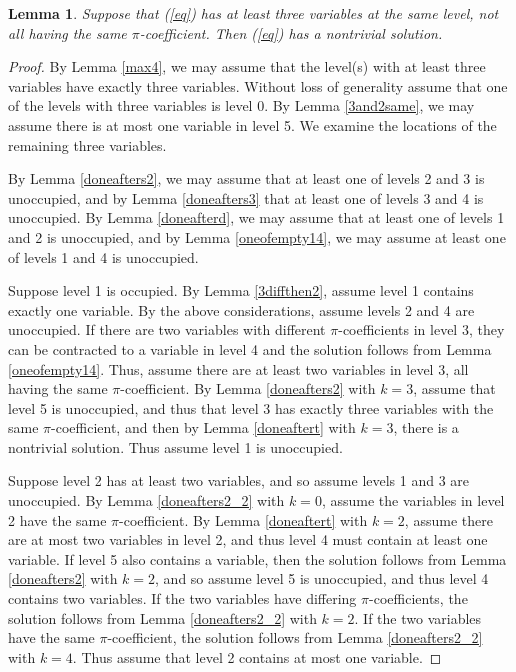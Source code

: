 \documentclass[draft]{publmathdeb}
\newtheorem{lemma}{Lemma}
\begin{document}
\begin{lemma}\label{max3_1}
Suppose that (\ref{eq}) has at least three variables at the same level, not all having the same $\pi$-coefficient.  Then (\ref{eq}) has a nontrivial solution.
\end{lemma}
\begin{proof}

By Lemma \ref{max4}, we may assume that the level(s) with at least three variables have exactly three variables.  Without loss of generality assume that one of the levels with three variables is level 0.  By Lemma \ref{3and2same}, we may assume there is at most one variable in level 5.  We examine the locations of the remaining three variables.

By Lemma \ref{doneafters2}, we may assume that at least one of levels 2 and 3 is unoccupied, and by Lemma \ref{doneafters3} that at least one of levels 3 and 4 is unoccupied.  By Lemma \ref{doneafterd}, we may assume that at least one of levels 1 and 2 is unoccupied, and by Lemma \ref{oneofempty14}, we may assume at least one of levels 1 and 4 is unoccupied.

Suppose level 1 is occupied.  By Lemma \ref{3diffthen2}, assume level 1 contains exactly one variable.  By the above considerations, assume levels 2 and 4 are unoccupied.  If there are two variables with different $\pi$-coefficients in level 3, they can be contracted to a variable in level 4 and the solution follows from Lemma \ref{oneofempty14}.  Thus, assume there are at least two variables in level 3, all having the same $\pi$-coefficient.  By Lemma \ref{doneafters2} with $k=3$, assume that level 5 is unoccupied, and thus that level 3 has exactly three variables with the same $\pi$-coefficient, and then by Lemma \ref{doneaftert} with $k=3$, there is a nontrivial solution.  Thus assume level 1 is unoccupied.

Suppose level 2 has at least two variables, and so assume levels 1 and 3 are unoccupied.  By Lemma \ref{doneafters2_2} with $k=0$, assume the variables in level 2 have the same $\pi$-coefficient.  By Lemma \ref{doneaftert} with $k=2$, assume there are at most two variables in level 2, and thus level 4 must contain at least one variable.  If level 5 also contains a variable, then the solution follows from Lemma \ref{doneafters2} with $k=2$, and so assume level 5 is unoccupied, and thus level 4 contains two variables.  If the two variables have differing $\pi$-coefficients, the solution follows from Lemma \ref{doneafters2_2} with $k=2$.  If the two variables have the same $\pi$-coefficient, the solution follows from Lemma \ref{doneafters2_2} with $k=4$.  Thus assume that level 2 contains at most one variable.


\end{proof}
\end{document}
